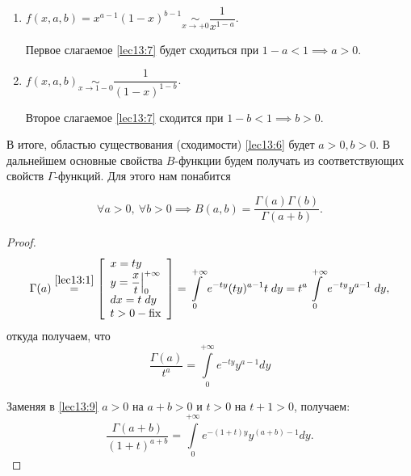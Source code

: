 \documentclass[../../main.tex]{subfiles}
\begin{document}
\begin{enumerate}
 \item $\displaystyle f(x, a, b) = x^{a-1}(1-x)^{b-1} \underset{x\to+0}\sim 
 \dfrac{1}{x^{1-a}}$.
 
  Первое слагаемое \eqref{lec13:7} будет сходиться при $1 - a < 1 \implies a > 
  0$.
  \item $f(x, a, b) \underset{x\to1-0}\sim \dfrac{1}{(1-x)^{1-b}}$.
  
  Второе слагаемое \eqref{lec13:7} сходится при $1-b < 1 \implies b > 0$.
\end{enumerate}

В итоге, областью существования (сходимости) \eqref{lec13:6} будет $a > 0, b > 
0$.
В дальнейшем основные свойства $B$-функции будем получать из соответствующих 
свойств $\Gamma$-функций. Для этого нам понабится

\begin{thm}
	\begin{equation}
	\label{lec13:8}
	\forall a > 0,\ \forall b>0 \implies B(a, b) = 
	\dfrac{\Gamma(a)\Gamma(b)}{\Gamma(a+b)}.
	\end{equation}
\end{thm}

\begin{proof}
	\[\Gamma(a) \stk{lec13:1}= \left[
	\begin{array}{l}
    x=ty \\
    y = \dfrac{x}{t}\Big|^{+\infty}_0 \\
    dx = t\; dy \\
    t > 0 - \fix
	\end{array}\right] = 
	\int\limits_0^{+\infty}e^{-ty}(ty)^{a-1}t\;dy = t^a 
	\int\limits_0^{+\infty}e^{-ty}y^{a-1}\;dy,\]
	откуда получаем, что
	\begin{equation}
		\label{lec13:9}
		\dfrac{\Gamma(a)}{t^a}=\int\limits_0^{+\infty}e^{-ty}y^{a-1}dy
	\end{equation}
	
	Заменяя в \eqref{lec13:9} $a > 0$ на $a+b > 0$ и $t > 0$ на $t+1 > 0$, 
	получаем:
	\begin{equation}
	\label{lec13:10}
	\dfrac{\Gamma(a+b)}{(1+t)^{a+b}} = \int\limits_0^{+\infty} e^{-(1+t)y} 
	y^{(a+b) - 
	1} dy.
	\end{equation}
\end{proof}
\end{document}
